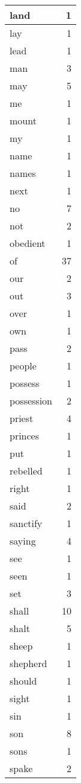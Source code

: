 \begin{center}
\begin{longtable}{l|r}
land & 1\\ \hline 
lay & 1\\ \hline 
lead & 1\\ \hline 
man & 3\\ \hline 
may & 5\\ \hline 
me & 1\\ \hline 
mount & 1\\ \hline 
my & 1\\ \hline 
name & 1\\ \hline 
names & 1\\ \hline 
next & 1\\ \hline 
no & 7\\ \hline 
not & 2\\ \hline 
obedient & 1\\ \hline 
of & 37\\ \hline 
our & 2\\ \hline 
out & 3\\ \hline 
over & 1\\ \hline 
own & 1\\ \hline 
pass & 2\\ \hline 
people & 1\\ \hline 
possess & 1\\ \hline 
possession & 2\\ \hline 
priest & 4\\ \hline 
princes & 1\\ \hline 
put & 1\\ \hline 
rebelled & 1\\ \hline 
right & 1\\ \hline 
said & 2\\ \hline 
sanctify & 1\\ \hline 
saying & 4\\ \hline 
see & 1\\ \hline 
seen & 1\\ \hline 
set & 3\\ \hline 
shall & 10\\ \hline 
shalt & 5\\ \hline 
sheep & 1\\ \hline 
shepherd & 1\\ \hline 
should & 1\\ \hline 
sight & 1\\ \hline 
sin & 1\\ \hline 
son & 8\\ \hline 
sons & 1\\ \hline 
spake & 2\\ \hline 

\end{longtable}
\end{center}
